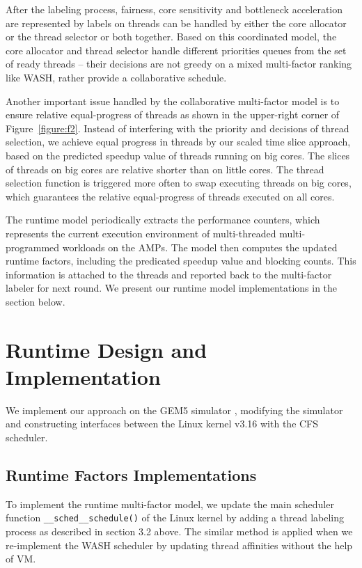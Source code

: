 \documentclass[10pt,conference]{IEEEtran}
\begin{document}
After the labeling process, fairness, core sensitivity and bottleneck acceleration are represented by labels on threads can be handled by either the core allocator or the thread selector or both together. Based on this coordinated model, the core allocator and thread selector handle different priorities queues from the set of ready threads -- their decisions are not greedy on a mixed multi-factor ranking like WASH, rather provide a collaborative schedule.

Another important issue handled by the collaborative multi-factor model is to ensure relative equal-progress of threads as shown in the upper-right corner of Figure~\ref{figure:f2}. Instead of interfering with the priority and decisions of thread selection, we achieve equal progress in threads by our scaled time slice approach, based on the predicted speedup value of threads running on big cores. The slices of threads on big cores are relative shorter than on little cores. The thread selection function is triggered more often to swap executing threads on big cores, which guarantees the relative equal-progress of threads executed on all cores.

The runtime model periodically extracts the performance counters, which represents the current execution environment of multi-threaded multi-programmed workloads on the AMPs. The model then computes the updated runtime factors, including the predicated speedup value and blocking counts. This information is attached to the threads and reported back to the multi-factor labeler for next round. We present our runtime model implementations in the section below. 

\section{Runtime Design and Implementation}
We implement our approach on the GEM5 simulator \cite{binkert2011gem5}, modifying the simulator and constructing interfaces between the Linux kernel v3.16 with the CFS scheduler.

\subsection{Runtime Factors Implementations}
To implement the runtime multi-factor model, we update the main scheduler function \texttt{\_\_sched\_\_schedule()} of the Linux kernel by adding a thread labeling process as described in section 3.2 above. The similar method is applied when we re-implement the WASH scheduler by updating thread affinities without the help of VM. 
\end{document}
